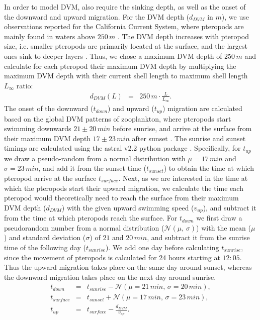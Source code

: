 In order to model DVM, also require the sinking depth, as well as the onset of the downward and upward migration. For the DVM depth ($d_{DVM}$ in $m$), we use observations reported for the California Current System, where pteropods are mainly found in waters above $250\, m$ \citep{Bednarsek2015VerticalDistribution}. The DVM depth increases with pteropod size, i.e. smaller pteropods are primarily located at the surface, and the largest ones sink to deeper layers  \citep{Bednarsek2015VerticalDistribution}. Thus, we chose a maximum DVM depth of $250\, m$ and calculate for each pteropod their maximum DVM depth by multiplying the maximum DVM depth with their current shell length to maximum shell length $L_{\infty}$ ratio:
\begin{eqnarray}
d_{DVM}(L) & = & 250\, m \cdot \frac{L}{L_{\infty}}.
\end{eqnarray}
The onset of the downward ($t_{down}$) and upward ($t_{up}$) migration are calculated based on the global DVM patterns of zooplankton, where pteropods start swimming downwards $21\pm 20\, min$ before sunrise, and arrive at the surface from their maximum DVM depth $17\pm 23\, min$ after sunset \cite{Bianchi2015GlobalDVM}. The sunrise and sunset timings are calculated using the astral v2.2 python package \citep{astral2020}. Specifically, for $t_{up}$ we draw a pseudo-random from a normal distribution with $\mu=17\,min$ and $\sigma=23\,min$, and add it from the sunset time ($t_{sunset}$) to obtain the time at which pteropod arrive at the surface $t_{surface}$. Next, as we are interested in the time at which the pteropods start their upward migration, we calculate the time each pteropod would theoretically need to reach the surface from their maximum DVM depth ($d_{DVM}$) with the given upward swimming speed ($v_{up}$), and subtract it from the time at which pteropods reach the surface. For $t_{down}$ we first draw a pseudorandom number from a normal distribution ($\mathcal{N}(\mu,\,\sigma)$) with the mean ($\mu$) and standard deviation ($\sigma$) of $21$ and $20\,min$, and subtract it from the sunrise time of the following day ($t_{sunrise}$). We add one day before calculating $t_{sunrise}$, since the movement of pteropods is calculated for 24 hours starting at $12:05$. Thus the upward migration takes place on the same day around sunset, whereas the downward migration takes place on the next day around sunrise.
\begin{eqnarray}
t_{down} & = & t_{sunrise} - \mathcal{N}(\mu=21\,min,\,\sigma=20\,min), \\
t_{surface} & = & t_{sunset} + \mathcal{N}(\mu=17\,min,\,\sigma=23\,min), \\
t_{up} & = & t_{surface} - \frac{d_{DVM}}{v_{up}}.
\end{eqnarray}




